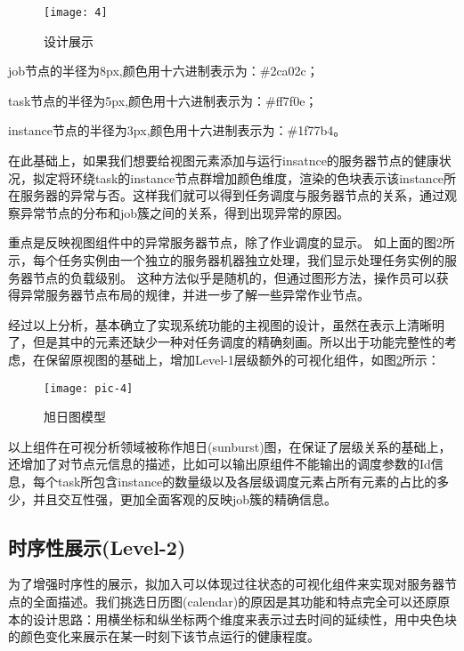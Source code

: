 \begin{figure}[h]
	\centering
	\texttt{[image: 4]}
	\caption{设计展示}
	\label{fig-4}
\end{figure}

job节点的半径为8px,颜色用十六进制表示为：\#2ca02c；

task节点的半径为5px,颜色用十六进制表示为：\#ff7f0e；

instance节点的半径为3px,颜色用十六进制表示为：\#1f77b4。

在此基础上，如果我们想要给视图元素添加与运行insatnce的服务器节点的健康状况，拟定将环绕task的instance节点群增加颜色维度，渲染的色块表示该instance所在服务器的异常与否。这样我们就可以得到任务调度与服务器节点的关系，通过观察异常节点的分布和job簇之间的关系，得到出现异常的原因。

重点是反映视图组件中的异常服务器节点，除了作业调度的显示。 如上面的图2所示，每个任务实例由一个独立的服务器机器独立处理，我们显示处理任务实例的服务器节点的负载级别。 这种方法似乎是随机的，但通过图形方法，操作员可以获得异常服务器节点布局的规律，并进一步了解一些异常作业节点。


经过以上分析，基本确立了实现系统功能的主视图的设计，虽然在表示上清晰明了，但是其中的元素还缺少一种对任务调度的精确刻画。所以出于功能完整性的考虑，在保留原视图的基础上，增加Level-1层级额外的可视化组件，如图\ref{pic-4}所示：

\begin{figure}[h]
	\centering
	\texttt{[image: pic-4]}
	\caption{旭日图模型}
	\label{pic-4}
\end{figure}

以上组件在可视分析领域被称作旭日(sunburst)图，在保证了层级关系的基础上，还增加了对节点元信息的描述，比如可以输出原组件不能输出的调度参数的Id信息，每个task所包含instance的数量级以及各层级调度元素占所有元素的占比的多少，并且交互性强，更加全面客观的反映job簇的精确信息。

\subsection{时序性展示(Level-2)}

为了增强时序性的展示，拟加入可以体现过往状态的可视化组件来实现对服务器节点的全面描述。我们挑选日历图(calendar)的原因是其功能和特点完全可以还原原本的设计思路：用横坐标和纵坐标两个维度来表示过去时间的延续性，用中央色块的颜色变化来展示在某一时刻下该节点运行的健康程度。


